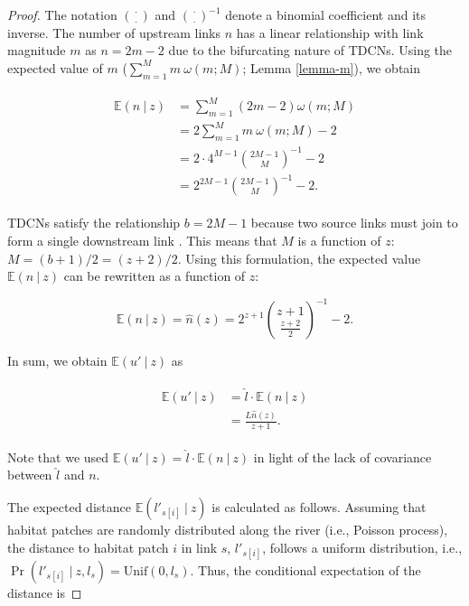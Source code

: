 \documentclass[11pt, class=article, crop=false]{standalone}
\theoremstyle{definition}
\begin{document}
\begin{proof}
The notation $\binom{\cdot}{\cdot}$ and $\binom{\cdot}{\cdot}^{-1}$ denote a binomial coefficient and its inverse.
The number of upstream links $n$ has a linear relationship with link magnitude $m$ as $n = 2m - 2$ due to the bifurcating nature of TDCNs.
Using the expected value of $m$ ($\sum_{m=1}^{M} m~\omega(m; M)$; Lemma \ref{lemma-m}), we obtain

\begin{align}
    \begin{split}
    \mathbb{E}(n~|~z) 
        &= \sum_{m=1}^{M} (2m - 2) \omega(m; M)\\
        &= 2 \sum_{m=1}^{M} m~\omega(m; M) - 2\\
        &= 2 \cdot 4^{M-1} \binom{2M-1}{M}^{-1} - 2\\
        &= 2^{2M-1} \binom{2M-1}{M}^{-1} - 2.
    \end{split}
    \label{eq:n-hat}
\end{align}

TDCNs satisfy the relationship $b = 2M - 1$ because two source links must join to form a single downstream link \cite{shreve_infinite_1967, rodriguez-iturbe_fractal_2001}.
This means that $M$ is a function of $z$: $M = (b + 1) / 2 = (z + 2) / 2$.
Using this formulation, the expected value $\mathbb{E}(n~|~z)$ can be rewritten as a function of $z$:

\begin{equation}
    \mathbb{E}(n~|~z) = \hat{n}(z) = 
    2^{z + 1} \binom{z + 1}{\frac{z + 2}{2}}^{-1} - 2.
\end{equation}

In sum, we obtain $\mathbb{E}(u' ~|~ z)$ as

\begin{align}
    \begin{split}
        \mathbb{E}(u' ~|~ z) 
        &= \hat{l} \cdot \mathbb{E}(n ~|~ z)\\
        &= \frac{L \hat{n}(z)}{z + 1}.
    \end{split}
\end{align}

Note that we used $\mathbb{E}(u' ~|~ z)  = \hat{l} \cdot \mathbb{E}(n ~|~ z)$ in light of the lack of covariance between $\hat{l}$ and $n$.

The expected distance $\mathbb{E}(l'_{s[i]}~|~z)$ is calculated as follows.
Assuming that habitat patches are randomly distributed along the river (i.e., Poisson process), the distance to habitat patch $i$ in link $s$, $l'_{s[i]}$, follows a uniform distribution, i.e.,  $\Pr(l'_{s[i]}~|~z, l_s) = \mbox{Unif}(0, l_s)$.
Thus, the conditional expectation of the distance is


\end{proof}
\end{document}
